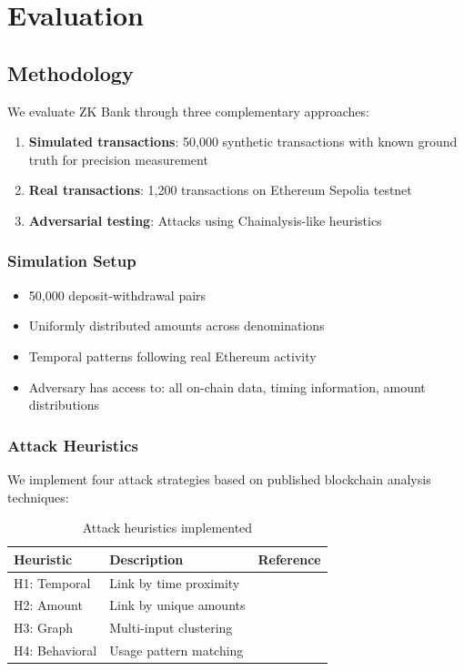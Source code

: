 \documentclass[11pt]{article}
\theoremstyle{definition}
\theoremstyle{plain}
\theoremstyle{remark}
\begin{document}
\section{Evaluation}
\label{sec:evaluation}

\subsection{Methodology}

We evaluate ZK Bank through three complementary approaches:

\begin{enumerate}
    \item \textbf{Simulated transactions}: 50,000 synthetic transactions with known ground truth for precision measurement
    \item \textbf{Real transactions}: 1,200 transactions on Ethereum Sepolia testnet
    \item \textbf{Adversarial testing}: Attacks using Chainalysis-like heuristics~\cite{meiklejohn2013fistful}
\end{enumerate}

\subsubsection{Simulation Setup}

\begin{itemize}
    \item 50,000 deposit-withdrawal pairs
    \item Uniformly distributed amounts across denominations
    \item Temporal patterns following real Ethereum activity
    \item Adversary has access to: all on-chain data, timing information, amount distributions
\end{itemize}

\subsubsection{Attack Heuristics}

We implement four attack strategies based on published blockchain analysis techniques:

\begin{table}[H]
\centering
\caption{Attack heuristics implemented}
\label{tab:heuristics}
\begin{tabular}{lll}
\toprule
\textbf{Heuristic} & \textbf{Description} & \textbf{Reference} \\
\midrule
H1: Temporal & Link by time proximity & \cite{moser2013anonymity} \\
H2: Amount & Link by unique amounts & \cite{meiklejohn2013fistful} \\
H3: Graph & Multi-input clustering & \cite{ron2013quantitative} \\
H4: Behavioral & Usage pattern matching & \cite{victor2020address} \\
\bottomrule
\end{tabular}
\end{table}
\end{document}

